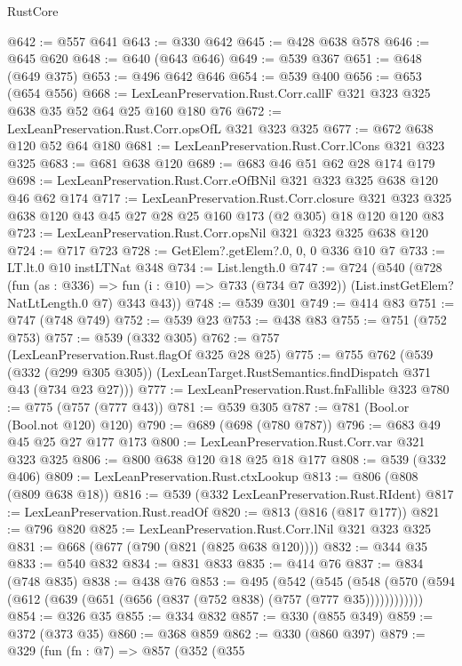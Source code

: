 \begin{lexlean}{RustCore}
\begin{coremodule}
@642 := @557 @641
@643 := @330 @642
@645 := @428 @638 @578
@646 := @645 @620
@648 := @640 (@643 @646)
@649 := @539 @367
@651 := @648 (@649 @375)
@653 := @496 @642 @646
@654 := @539 @400
@656 := @653 (@654 @556)
@668 := LexLeanPreservation.Rust.Corr.callF @321 @323 @325 @638 @35 @52 @64 @25 @160 @180 @76
@672 := LexLeanPreservation.Rust.Corr.opsOfL @321 @323 @325
@677 := @672 @638 @120 @52 @64 @180
@681 := LexLeanPreservation.Rust.Corr.lCons @321 @323 @325
@683 := @681 @638 @120
@689 := @683 @46 @51 @62 @28 @174 @179
@698 := LexLeanPreservation.Rust.Corr.eOfBNil @321 @323 @325 @638 @120 @46 @62 @174
@717 := LexLeanPreservation.Rust.Corr.closure
    @321
    @323
    @325
    @638
    @120
    @43
    @45
    @27
    @28
    @25
    @160
    @173
    (@2 @305)
    @18
    @120
    @120
    @83
@723 := LexLeanPreservation.Rust.Corr.opsNil @321 @323 @325 @638 @120
@724 := @717 @723
@728 := GetElem?.getElem?.{0, 0, 0} @336 @10 @7
@733 := LT.lt.{0} @10 instLTNat @348
@734 := List.length.{0}
@747 := @724
    (@540
      (@728
        (fun (as : @336) => fun (i : @10) => @733 (@734 @7 @392))
        (List.instGetElem?NatLtLength.{0} @7)
        @343
        @43))
@748 := @539 @301
@749 := @414 @83
@751 := @747 (@748 @749)
@752 := @539 @23
@753 := @438 @83
@755 := @751 (@752 @753)
@757 := @539 (@332 @305)
@762 := @757 (LexLeanPreservation.Rust.flagOf @325 @28 @25)
@775 := @755
    @762
    (@539
      (@332 (@299 @305 @305))
      (LexLeanTarget.RustSemantics.findDispatch @371 @43 (@734 @23 @27)))
@777 := LexLeanPreservation.Rust.fnFallible @323
@780 := @775 (@757 (@777 @43))
@781 := @539 @305
@787 := @781 (Bool.or (Bool.not @120) @120)
@790 := @689 (@698 (@780 @787))
@796 := @683 @49 @45 @25 @27 @177 @173
@800 := LexLeanPreservation.Rust.Corr.var @321 @323 @325
@806 := @800 @638 @120 @18 @25 @18 @177
@808 := @539 (@332 @406)
@809 := LexLeanPreservation.Rust.ctxLookup
@813 := @806 (@808 (@809 @638 @18))
@816 := @539 (@332 LexLeanPreservation.Rust.RIdent)
@817 := LexLeanPreservation.Rust.readOf
@820 := @813 (@816 (@817 @177))
@821 := @796 @820
@825 := LexLeanPreservation.Rust.Corr.lNil @321 @323 @325
@831 := @668 (@677 (@790 (@821 (@825 @638 @120))))
@832 := @344 @35
@833 := @540 @832
@834 := @831 @833
@835 := @414 @76
@837 := @834 (@748 @835)
@838 := @438 @76
@853 := @495
    (@542
      (@545 (@548 (@570 (@594 (@612 (@639 (@651 (@656 (@837 (@752 @838) (@757 (@777 @35))))))))))))
@854 := @326 @35
@855 := @334 @832
@857 := @330 (@855 @349)
@859 := @372 (@373 @35)
@860 := @368 @859
@862 := @330 (@860 @397)
@879 := @329
    (fun (fn : @7) =>
    @857
      (@352
        (@355

\end{coremodule}
\end{lexlean}
